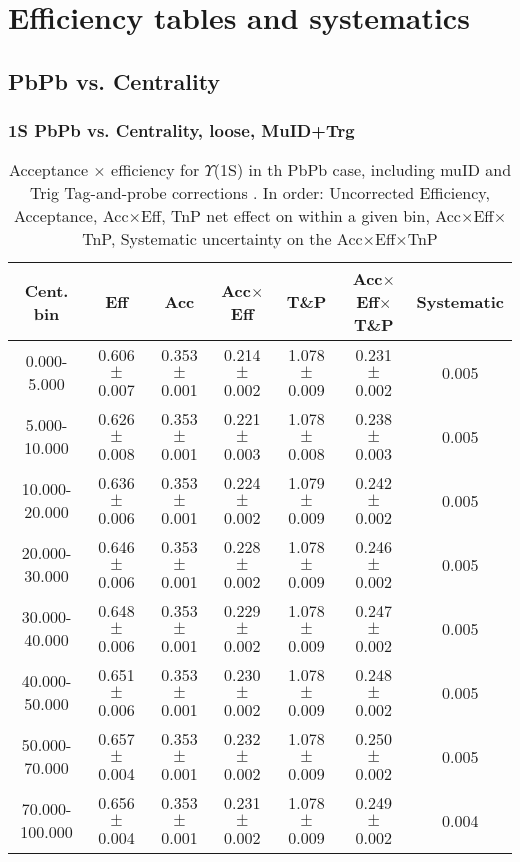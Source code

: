 
\chapter{Efficiency tables and systematics}

\label{chap:syst_tnp_note}

\section{PbPb vs. Centrality}

\subsection{1S PbPb vs. Centrality, loose, MuID+Trg}

\begin{table}[h]
\begin{center}
\begin{tabular}{|c|c|c|c|c|c|c|}
\hline
Cent. bin& Eff & Acc & Acc$\times$Eff & T\&P & Acc$\times$Eff$\times$T\&P  & Systematic \\
\hline 
0.000-5.000 & 0.606 $\pm$ 0.007 & 0.353 $\pm$ 0.001 & 0.214 $\pm$ 0.002 & 1.078 $\pm$ 0.009 & 0.231 $\pm$ 0.002 & 0.005 \\
5.000-10.000 & 0.626 $\pm$ 0.008 & 0.353 $\pm$ 0.001 & 0.221 $\pm$ 0.003 & 1.078 $\pm$ 0.008 & 0.238 $\pm$ 0.003 & 0.005 \\
10.000-20.000 & 0.636 $\pm$ 0.006 & 0.353 $\pm$ 0.001 & 0.224 $\pm$ 0.002 & 1.079 $\pm$ 0.009 & 0.242 $\pm$ 0.002 & 0.005 \\
20.000-30.000 & 0.646 $\pm$ 0.006 & 0.353 $\pm$ 0.001 & 0.228 $\pm$ 0.002 & 1.078 $\pm$ 0.009 & 0.246 $\pm$ 0.002 & 0.005 \\
30.000-40.000 & 0.648 $\pm$ 0.006 & 0.353 $\pm$ 0.001 & 0.229 $\pm$ 0.002 & 1.078 $\pm$ 0.009 & 0.247 $\pm$ 0.002 & 0.005 \\
40.000-50.000 & 0.651 $\pm$ 0.006 & 0.353 $\pm$ 0.001 & 0.230 $\pm$ 0.002 & 1.078 $\pm$ 0.009 & 0.248 $\pm$ 0.002 & 0.005 \\
50.000-70.000 & 0.657 $\pm$ 0.004 & 0.353 $\pm$ 0.001 & 0.232 $\pm$ 0.002 & 1.078 $\pm$ 0.009 & 0.250 $\pm$ 0.002 & 0.005 \\
70.000-100.000 & 0.656 $\pm$ 0.004 & 0.353 $\pm$ 0.001 & 0.231 $\pm$ 0.002 & 1.078 $\pm$ 0.009 & 0.249 $\pm$ 0.002 & 0.004 \\
\hline                           
\end{tabular}
\caption{Acceptance $\times$ efficiency for $\Upsilon$(1S) in th PbPb
case, including muID and Trig Tag-and-probe corrections . In order: Uncorrected Efficiency, Acceptance, Acc$\times$Eff,
TnP net effect on within a given bin, Acc$\times$Eff$\times$TnP,
Systematic uncertainty on the  Acc$\times$Eff$\times$TnP }
\label{Aet_1S_pyquen_cent2014_muIDTrig}
\end{center}
\end{table}


